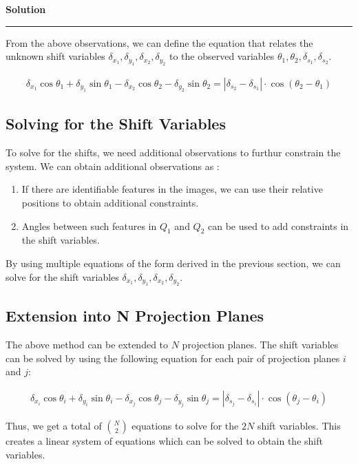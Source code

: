 \documentclass[a4paper,12pt]{article}
\newenvironment{solution}[2][]{%
    \begin{mdframed}[linecolor=blue!70!black, linewidth=2pt, roundcorner=10pt, backgroundcolor=yellow!10!white, skipabove=12pt, skipbelow=12pt]%
        \textbf{\large #2}
        \par\noindent\rule{\textwidth}{0.4pt}
}{
    \end{mdframed}
}
\begin{document}
\begin{solution}{Solution}
\noindent From the above observations, we can define the equation that relates the unknown shift variables $\delta_{x_1}, \delta_{y_1}, \delta_{x_2}, \delta_{y_2}$ to the observed variables $\theta_1, \theta_2, \delta_{s_1}, \delta_{s_2}$.

\begin{align*}
    \delta_{x_1} \cos \theta_1 + \delta_{y_1} \sin \theta_1  - \delta_{x_2} \cos \theta_2 - \delta_{y_2} \sin \theta_2 = |\delta_{s_2} - \delta_{s_1}|\cdot \cos(\theta_2 - \theta_1)
\end{align*}

\subsection{Solving for the Shift Variables}

\noindent To solve for the shifts, we need additional observations to furthur constrain the system. We can obtain additional observations as :

\begin{enumerate}
  \item If there are identifiable features in the images, we can use their relative positions to obtain additional constraints.
  \item Angles between such features in $Q_1$ and $Q_2$ can be used to add constraints in the shift variables.
\end{enumerate}

\noindent By using multiple equations of the form derived in the previous section, we can solve for the shift variables $\delta_{x_1}, \delta_{y_1}, \delta_{x_2}, \delta_{y_2}$.

\subsection{Extension into N Projection Planes}

\noindent The above method can be extended to $N$ projection planes. The shift variables can be solved by using the following equation for each pair of projection planes $i$ and $j$:

\begin{align*}
    \delta_{x_i} \cos \theta_i + \delta_{y_i} \sin \theta_i  - \delta_{x_j} \cos \theta_j - \delta_{y_j} \sin \theta_j = |\delta_{s_j} - \delta_{s_i}|\cdot \cos(\theta_j - \theta_i)
\end{align*}

\noindent Thus, we get a total of $\binom{N}{2}$ equations to solve for the $2N$ shift variables. This creates a linear system of equations which can be solved to obtain the shift variables.

\end{solution}
\end{document}
